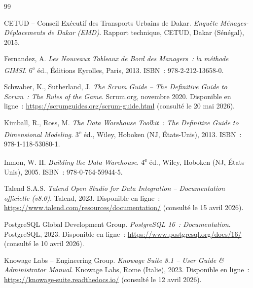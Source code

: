 
\begin{thebibliography}{99}


CETUD -- Conseil Exécutif des Transports Urbains de Dakar.
\emph{Enquête Ménages-Déplacements de Dakar (EMD)}.
Rapport technique, CETUD, Dakar (Sénégal), 2015.


Fernandez, A.
\emph{Les Nouveaux Tableaux de Bord des Managers~: la méthode GIMSI}.
6\textsuperscript{e} éd., Éditions Eyrolles, Paris, 2013.
ISBN~: 978-2-212-13658-0.

Schwaber, K., Sutherland, J.
\emph{The Scrum Guide -- The Definitive Guide to Scrum~: The Rules of the Game}.
Scrum.org, novembre 2020.
Disponible en ligne~: \url{https://scrumguides.org/scrum-guide.html}
(consulté le 20 mai 2026).


Kimball, R., Ross, M.
\emph{The Data Warehouse Toolkit~: The Definitive Guide to Dimensional Modeling}.
3\textsuperscript{e} éd., Wiley, Hoboken (NJ, États-Unis), 2013.
ISBN~: 978-1-118-53080-1.

Inmon, W. H.
\emph{Building the Data Warehouse}.
4\textsuperscript{e} éd., Wiley, Hoboken (NJ, États-Unis), 2005.
ISBN~: 978-0-764-59944-5.


Talend S.A.S.
\emph{Talend Open Studio for Data Integration -- Documentation officielle (v8.0)}.
Talend, 2023.
Disponible en ligne~: \url{https://www.talend.com/resources/documentation/}
(consulté le 15 avril 2026).

PostgreSQL Global Development Group.
\emph{PostgreSQL 16~: Documentation}.
PostgreSQL, 2023.
Disponible en ligne~: \url{https://www.postgresql.org/docs/16/}
(consulté le 10 avril 2026).


Knowage Labs -- Engineering Group.
\emph{Knowage Suite 8.1 -- User Guide \& Administrator Manual}.
Knowage Labs, Rome (Italie), 2023.
Disponible en ligne~: \url{https://knowage-suite.readthedocs.io/}
(consulté le 12 avril 2026).


\end{thebibliography}
